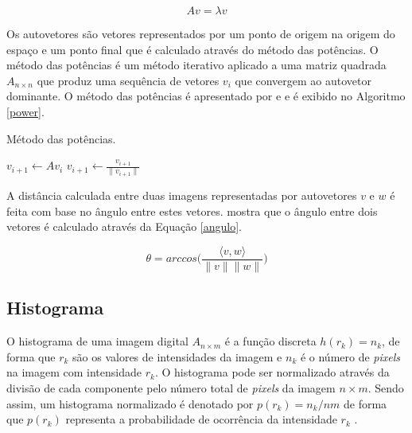 \begin{equation}
  \label{autovetor}
  	Av = \lambda v
\end{equation}

Os autovetores são vetores representados por um ponto de origem na origem do espaço e um ponto final que é calculado através do método das potências. O método das potências é um método iterativo aplicado a uma matriz quadrada $A_{n \times n}$ que produz uma sequência de vetores $v_i$ que convergem ao autovetor dominante. O método das potências é apresentado por  e  e é exibido no {Algoritmo \ref{power}}.

\begin{algorithm}[H]
\caption{Método das potências.}
\label{power}
	\begin{algorithmic}[1]
				\State $v_{i+1} \gets Av_i$
				\State $v_{i+1} \gets \frac{v_{i+1}}{\parallel v_{i+1} \parallel}$
		\EndFor
	\end{algorithmic}
\end{algorithm}

A distância calculada entre duas imagens representadas por autovetores $v$ e $w$ é feita com base no ângulo entre estes vetores.  mostra que o ângulo entre dois vetores é calculado através da Equação \ref{angulo}.

\begin{equation}
  \label{angulo}
  	\theta = arccos \Bigg ( \frac{\langle v, w \rangle}{\parallel v \parallel \parallel w \parallel} \Bigg )
\end{equation}

\subsection{Histograma}

O histograma de uma imagem digital $A_{n \times m}$ é a função discreta $h(r_k) = n_k$, de forma que $r_k$ são os valores de intensidades da imagem e $n_k$ é o número de \emph{pixels} na imagem com intensidade $r_k$. O histograma pode ser normalizado através da divisão de cada componente pelo número total de \emph{pixels} da imagem $n \times m$. Sendo assim, um histograma normalizado é denotado por $p(r_k) = n_k/{nm}$ de forma que $p(r_k)$ representa a probabilidade de ocorrência da intensidade $r_k$ \cite{Gonzalez:2006:DIP:1076432}.

